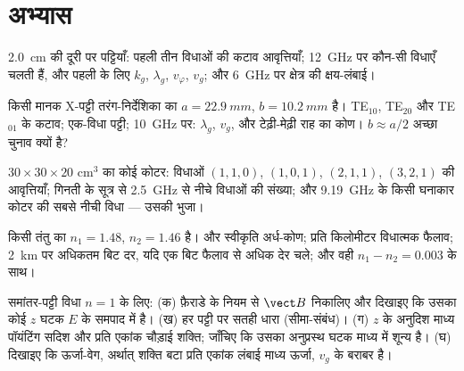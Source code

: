 \section{अभ्यास}

\begin{exercise}[$\star$]\label{exo:b2:guided-waves:1}
\qty{2.0}{cm} की दूरी पर पट्टियाँ: पहली तीन विधाओं की कटाव आवृत्तियाँ;
\qty{12}{GHz} पर कौन-सी विधाएँ चलती हैं, और पहली के लिए $k_g$,
$\lambda_g$, $v_\varphi$, $v_g$; और \qty{6}{GHz} पर क्षेत्र की क्षय-लंबाई।
\end{exercise}

\begin{exercise}[$\star$]\label{exo:b2:guided-waves:2}
किसी मानक X-पट्टी तरंग-निर्देशिका का $a = \qty{22.9}{mm}$, $b = \qty{10.2}{mm}$ है।
TE$_{10}$, TE$_{20}$ और TE$_{01}$ के कटाव; एक-विधा पट्टी;
\qty{10}{GHz} पर: $\lambda_g$, $v_g$, और टेढ़ी-मेढ़ी राह का कोण। $b \approx a/2$
अच्छा चुनाव क्यों है?
\end{exercise}

\begin{exercise}[$\star$]\label{exo:b2:guided-waves:3}
$30 \times 30 \times 20$ cm$^3$ का कोई कोटर: विधाओं $(1,1,0)$,
$(1,0,1)$, $(2,1,1)$, $(3,2,1)$ की आवृत्तियाँ; गिनती के सूत्र से
\qty{2.5}{GHz} से नीचे विधाओं की संख्या; और \qty{9.19}{GHz} के किसी घनाकार कोटर
की सबसे नीची विधा --- उसकी भुजा।
\end{exercise}

\begin{exercise}[$\star$]\label{exo:b2:guided-waves:4}
किसी तंतु का $n_1 = 1.48$, $n_2 = 1.46$ है।  और स्वीकृति
अर्ध-कोण; प्रति किलोमीटर विधात्मक फैलाव; \qty{2}{km} पर अधिकतम बिट दर,
यदि एक बिट फैलाव से अधिक देर चले; और वही
$n_1 - n_2 = 0.003$ के साथ।
\end{exercise}

\begin{exercise}[$\star\star$]\label{exo:b2:guided-waves:5}
समांतर-पट्टी विधा $n = 1$ के लिए: (क) फ़ैराडे के नियम से $\vect B$ निकालिए
और दिखाइए कि उसका कोई $z$ घटक $E$ के समपाद में है। (ख) हर पट्टी पर
सतही धारा (सीमा-संबंध)। (ग) $z$ के अनुदिश माध्य पॉयंटिंग सदिश
और प्रति एकांक चौड़ाई शक्ति; जाँचिए कि उसका अनुप्रस्थ
घटक माध्य में शून्य है। (घ) दिखाइए कि ऊर्जा-वेग, अर्थात् शक्ति
बटा प्रति एकांक लंबाई माध्य ऊर्जा, $v_g$ के बराबर है।
\end{exercise}

